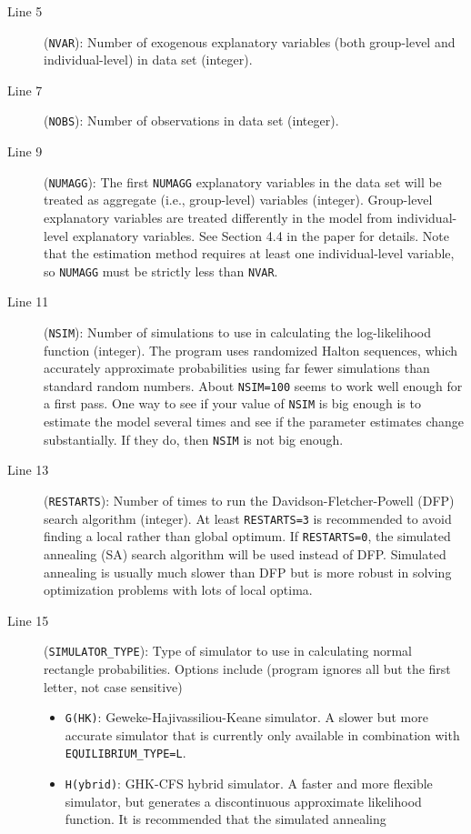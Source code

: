 \documentclass{article}
\begin{document}
\begin{description}
\item[Line 5] ({\tt NVAR}): Number of exogenous explanatory variables (both group-level and individual-level)
	in data set (integer).
\item[Line 7] ({\tt NOBS}): Number of observations in data set (integer).
\item[Line 9] ({\tt NUMAGG}): The first {\tt NUMAGG} explanatory variables in the data set will be treated 
	as aggregate (i.e., group-level) variables (integer).  Group-level explanatory variables
	are treated differently in the model from individual-level explanatory variables.  See Section 4.4 in 
	the paper for details.  Note that the estimation method requires at least one individual-level 
	variable, so {\tt NUMAGG} must be strictly less than {\tt NVAR}.
\item[Line 11] ({\tt NSIM}): Number of simulations to use in calculating the log-likelihood function (integer).
	The program uses randomized Halton sequences, which accurately approximate probabilities using
	far fewer simulations than standard random numbers.  About {\tt NSIM=100} seems to work well enough 
	for a first pass.  One way to see if your value of {\tt NSIM} is big enough is to estimate the
	model several times and see if the parameter estimates change substantially.  If they do,
	then {\tt NSIM} is not big enough.
\item[Line 13] ({\tt RESTARTS}): Number of times to run the Davidson-Fletcher-Powell (DFP) search algorithm (integer).  
	At least {\tt RESTARTS=3} is recommended to avoid finding a local rather than global optimum.   
	If {\tt RESTARTS=0}, the simulated annealing (SA) search algorithm will be used instead of DFP.  Simulated
	annealing is usually much slower than DFP but is more robust in solving optimization problems
	with lots of local optima.
\item[Line 15] ({\tt SIMULATOR\_{}TYPE}): Type of simulator to use in calculating normal rectangle probabilities.
	Options include (program ignores all but the first letter, not case sensitive)
	\begin{itemize}
		\item {\tt G(HK)}: Geweke-Hajivassiliou-Keane simulator.  A slower but more accurate simulator that 
			is currently only available in combination  with {\tt EQUILIBRIUM\_{}TYPE=L}.
		\item {\tt H(ybrid)}: GHK-CFS hybrid simulator.  A faster and more flexible simulator, but generates
			a discontinuous approximate likelihood function.  It is recommended that the simulated annealing

\end{itemize}
\end{description}
\end{document}
